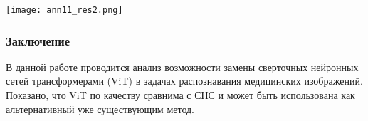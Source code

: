 \begin{minipage}{1.0\linewidth}
    \begin{center}
        \texttt{[image: ann11\_res2.png]} \\
    \end{center}
    
\end{minipage}

\subsubsection*{Заключение}
В данной работе проводится анализ возможности замены сверточных
нейронных сетей трансформерами (ViT) в задачах распознавания
медицинских изображений. Показано, что ViT по качеству сравнима 
с СНС и может быть использована как альтернативный уже существующим метод.